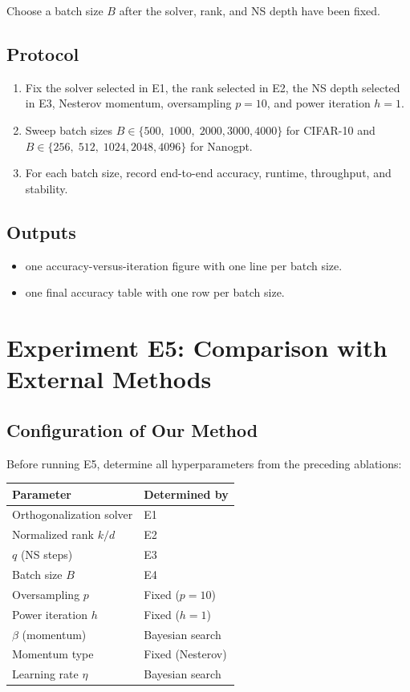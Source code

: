 \documentclass[11pt]{article}
\begin{document}
Choose a batch size $B$ after the solver, rank, and NS depth have been fixed.

\subsection{Protocol}

\begin{enumerate}[nosep]
\item Fix the solver selected in E1, the rank selected in E2, the NS depth selected in E3, Nesterov momentum, oversampling $p=10$, and power iteration $h=1$.
\item Sweep batch sizes $B \in \{500,\; 1000,\; 2000, 3000, 4000\}$ for CIFAR-10 and $B \in \{256,\; 512,\; 1024, 2048, 4096\}$ for Nanogpt.
\item For each batch size, record end-to-end accuracy, runtime, throughput, and stability.
\end{enumerate}

\subsection{Outputs}

\begin{itemize}[nosep]
\item one accuracy-versus-iteration figure with one line per batch size.
\item one final accuracy table with one row per batch size.
\end{itemize}


\section{Experiment E5: Comparison with External Methods}

\subsection{Configuration of Our Method}

Before running E5, determine all hyperparameters from the preceding ablations:

\begin{table}[ht]
\centering
\begin{tabular}{ll}
\toprule
\textbf{Parameter} & \textbf{Determined by} \\
\midrule
Orthogonalization solver & E1 \\
Normalized rank $k/d$ & E2 \\
$q$ (NS steps) & E3 \\
Batch size $B$ & E4 \\
Oversampling $p$ & Fixed ($p=10$) \\
Power iteration $h$ & Fixed ($h=1$) \\
$\beta$ (momentum) & Bayesian search \\
Momentum type & Fixed (Nesterov) \\
Learning rate $\eta$ & Bayesian search \\
\bottomrule
\end{tabular}
\end{table}
\end{document}
